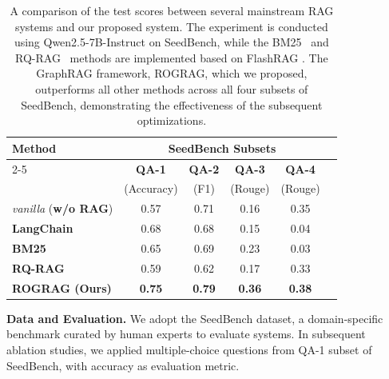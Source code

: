\documentclass[11pt]{article}
\begin{document}
\renewcommand{\arraystretch}{1.2}
\begin{table}[t]
\centering
\small
\setlength{\tabcolsep}{3pt}
\begin{tabular}{lccccc}
\hline
\multirow{3}{*}{\textbf{Method}} & \multicolumn{4}{c}{\textbf{SeedBench Subsets}} \\ \cline{2-5}
& \textbf{QA-1} & \textbf{QA-2} & \textbf{QA-3} & \textbf{QA-4} \\ 
& (Accuracy) & (F1) & (Rouge) & (Rouge) \\\hline
\textit{vanilla} (\textbf{w/o RAG}) & 0.57 & 0.71 & 0.16 & 0.35 \\
\textbf{LangChain} & 0.68 & 0.68 & 0.15 & 0.04 \\
\textbf{BM25} & 0.65 & 0.69 & 0.23 & 0.03 \\
\textbf{RQ-RAG} & 0.59 & 0.62 & 0.17 & 0.33 \\\hline
\textbf{ROGRAG (Ours)} & \textbf{0.75} & \textbf{0.79} & \textbf{0.36} & \textbf{0.38} \\\hline
\end{tabular}
\caption{A comparison of the test scores between several mainstream RAG systems and our proposed system. The experiment is conducted using Qwen2.5-7B-Instruct on SeedBench, while the BM25~\cite{FlashRAG} and RQ-RAG~\cite{chan2024rq} methods are implemented based on FlashRAG \cite{FlashRAG}. The GraphRAG framework, ROGRAG, which we proposed, outperforms all other methods across all four subsets of SeedBench, demonstrating the effectiveness of the subsequent optimizations.}
\label{tab:ROGRAG}
\end{table}

\noindent\textbf{Data and Evaluation.} We adopt the SeedBench \cite{ying2025seedbench} dataset, a domain-specific benchmark curated by human experts to evaluate systems. 
In subsequent ablation studies, we applied multiple-choice questions from QA-1 subset of SeedBench, with accuracy as evaluation metric.
\end{document}
